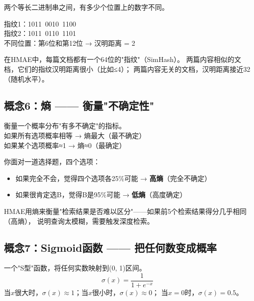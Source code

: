 \documentclass[11pt,a4paper]{ctexart}
\begin{document}
\begin{defbox}
两个等长二进制串之间，有多少个位置上的数字不同。
\end{defbox}

\begin{exambox}[例子：比较两个指纹]
指纹1：1011\ 0010\ 1100\\
指纹2：1011\ 0110\ 1101\\
不同位置：第6位和第12位 → 汉明距离 = 2
\end{exambox}

在HMAE中，每篇文档都有一个64位的"指纹"（SimHash）。
两篇内容相似的文档，它们的指纹汉明距离很小（比如≤4）；
两篇内容无关的文档，汉明距离接近32（随机水平）。

\subsection{概念6：熵 —— 衡量"不确定性"}

\begin{defbox}[熵 (Entropy)]
衡量一个概率分布"有多不确定"的指标。\\
如果所有选项概率相等 → 熵最大（最不确定）\\
如果某个选项概率≈1 → 熵≈0（最确定）
\end{defbox}

\begin{exambox}
你面对一道选择题，四个选项：
\begin{itemize}[nosep]
\item 如果完全不会，觉得四个选项各25\%可能 → \textbf{高熵}（完全不确定）
\item 如果很肯定选B，觉得B是95\%可能 → \textbf{低熵}（高度确定）
\end{itemize}
HMAE用熵来衡量"检索结果是否难以区分"——如果前5个检索结果得分几乎相同（高熵），
说明查询太模糊，需要触发深度检索。
\end{exambox}

\subsection{概念7：Sigmoid函数 —— 把任何数变成概率}

\begin{defbox}[Sigmoid函数]
一个"S型"函数，将任何实数映射到(0, 1)区间。
$$\sigma(x) = \frac{1}{1 + e^{-x}}$$
当$x$很大时，$\sigma(x) \approx 1$；当$x$很小时，$\sigma(x) \approx 0$；
当$x=0$时，$\sigma(x) = 0.5$。
\end{defbox}
\end{document}
